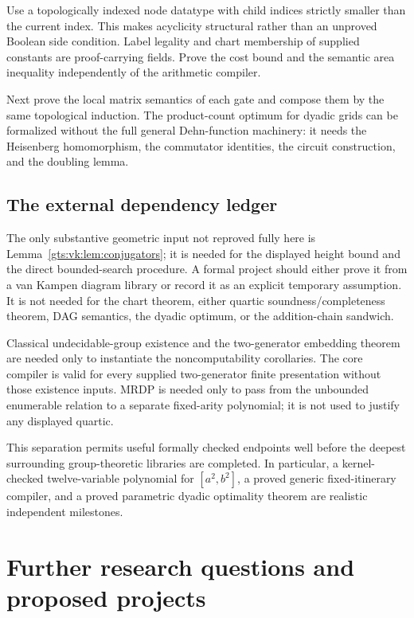 \documentclass[11pt,letterpaper]{article}
\theoremstyle{definition}
\theoremstyle{remark}
\begin{document}
Use a topologically indexed node datatype with child indices strictly smaller than the current index. This makes acyclicity structural rather than an unproved Boolean side condition. Label legality and chart membership of supplied constants are proof-carrying fields. Prove the cost bound and the semantic area inequality independently of the arithmetic compiler.

Next prove the local matrix semantics of each gate and compose them by the same topological induction. The product-count optimum for dyadic grids can be formalized without the full general Dehn-function machinery: it needs the Heisenberg homomorphism, the commutator identities, the circuit construction, and the doubling lemma.

\subsection{The external dependency ledger}

The only substantive geometric input not reproved fully here is Lemma~\ref{gts:vk:lem:conjugators}; it is needed for the displayed height bound and the direct bounded-search procedure. A formal project should either prove it from a van Kampen diagram library or record it as an explicit temporary assumption. It is not needed for the chart theorem, either quartic soundness/completeness theorem, DAG semantics, the dyadic optimum, or the addition-chain sandwich.

Classical undecidable-group existence and the two-generator embedding theorem are needed only to instantiate the noncomputability corollaries. The core compiler is valid for every supplied two-generator finite presentation without those existence inputs. MRDP is needed only to pass from the unbounded enumerable relation to a separate fixed-arity polynomial; it is not used to justify any displayed quartic.

This separation permits useful formally checked endpoints well before the deepest surrounding group-theoretic libraries are completed. In particular, a kernel-checked twelve-variable polynomial for $[a^2,b^2]$, a proved generic fixed-itinerary compiler, and a proved parametric dyadic optimality theorem are realistic independent milestones.

\section{Further research questions and proposed projects}\label{gts:vk:sec:questions}
\end{document}
